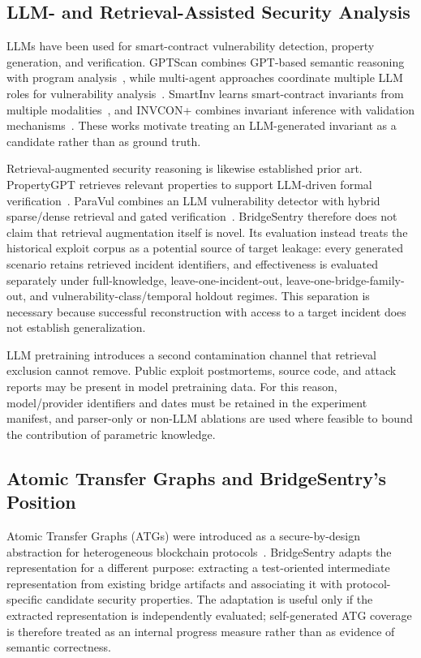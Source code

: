 \subsection{LLM- and Retrieval-Assisted Security Analysis}

LLMs have been used for smart-contract vulnerability detection, property generation, and verification. GPTScan combines GPT-based semantic reasoning with program analysis~\citep{sun2024gptscan}, while multi-agent approaches coordinate multiple LLM roles for vulnerability analysis~\citep{wei2025advanced}. SmartInv learns smart-contract invariants from multiple modalities~\citep{wang2024smartinv}, and INVCON+ combines invariant inference with validation mechanisms~\citep{liu2025invcon}. These works motivate treating an LLM-generated invariant as a candidate rather than as ground truth.

Retrieval-augmented security reasoning is likewise established prior art. PropertyGPT retrieves relevant properties to support LLM-driven formal verification~\citep{liu2025propertygpt}. ParaVul combines an LLM vulnerability detector with hybrid sparse/dense retrieval and gated verification~\citep{huang2026paravul}. BridgeSentry therefore does not claim that retrieval augmentation itself is novel. Its evaluation instead treats the historical exploit corpus as a potential source of target leakage: every generated scenario retains retrieved incident identifiers, and effectiveness is evaluated separately under full-knowledge, leave-one-incident-out, leave-one-bridge-family-out, and vulnerability-class/temporal holdout regimes. This separation is necessary because successful reconstruction with access to a target incident does not establish generalization.

LLM pretraining introduces a second contamination channel that retrieval exclusion cannot remove. Public exploit postmortems, source code, and attack reports may be present in model pretraining data. For this reason, model/provider identifiers and dates must be retained in the experiment manifest, and parser-only or non-LLM ablations are used where feasible to bound the contribution of parametric knowledge.

\subsection{Atomic Transfer Graphs and BridgeSentry's Position}

Atomic Transfer Graphs (ATGs) were introduced as a secure-by-design abstraction for heterogeneous blockchain protocols~\citep{dubler2025atg}. BridgeSentry adapts the representation for a different purpose: extracting a test-oriented intermediate representation from existing bridge artifacts and associating it with protocol-specific candidate security properties. The adaptation is useful only if the extracted representation is independently evaluated; self-generated ATG coverage is therefore treated as an internal progress measure rather than as evidence of semantic correctness.

